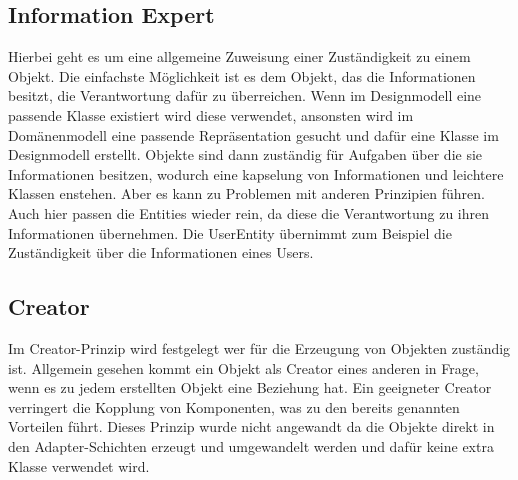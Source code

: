 \subsection{Information Expert}
Hierbei geht es um eine allgemeine Zuweisung einer Zuständigkeit zu einem Objekt.
Die einfachste Möglichkeit ist es dem Objekt, das die Informationen besitzt, die Verantwortung dafür zu überreichen.
Wenn im Designmodell eine passende Klasse existiert wird diese verwendet, ansonsten wird im Domänenmodell eine passende Repräsentation gesucht und dafür eine Klasse im Designmodell erstellt.
Objekte sind dann zuständig für Aufgaben über die sie Informationen besitzen, wodurch eine kapselung von Informationen und leichtere Klassen enstehen.
Aber es kann zu Problemen mit anderen Prinzipien führen.
Auch hier passen die Entities wieder rein, da diese die Verantwortung zu ihren Informationen übernehmen.
Die UserEntity übernimmt zum Beispiel die Zuständigkeit über die Informationen eines Users.
\subsection{Creator}
Im Creator-Prinzip wird festgelegt wer für die Erzeugung von Objekten zuständig ist.
Allgemein gesehen kommt ein Objekt als Creator eines anderen in Frage, wenn es zu jedem erstellten Objekt eine Beziehung hat.
Ein geeigneter Creator verringert die Kopplung von Komponenten, was zu den bereits genannten Vorteilen führt.
Dieses Prinzip wurde nicht angewandt da die Objekte direkt in den Adapter-Schichten erzeugt und umgewandelt werden und dafür keine extra Klasse verwendet wird.

